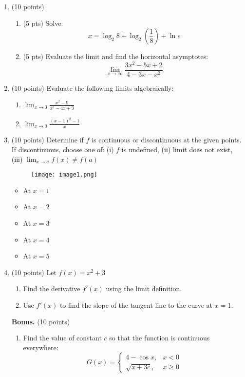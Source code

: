 \documentclass[12pt]{article}
\begin{document}
\begin{enumerate}
    \item (10 points)
    \begin{enumerate}
        \item (5 pts) Solve:
        \[
        x = \log_2 8 + \log_2 \left(\frac{1}{8}\right) + \ln e
        \]

        \item (5 pts) Evaluate the limit and find the horizontal asymptotes:
        \[
        \lim_{x \to \infty} \frac{3x^2 - 5x + 2}{4 - 3x - x^2}
        \]
    \end{enumerate}

    \item (10 points) Evaluate the following limits algebraically:
    \begin{enumerate}
        \item \( \lim_{x \to 3} \frac{x^2 - 9}{x^2 - 4x + 3} \)
        \item \( \lim_{x \to 0} \frac{(x - 1)^2 - 1}{x} \)
    \end{enumerate}

    \item (10 points) Determine if \( f \) is continuous or discontinuous at the given points. If discontinuous, choose one of: 
    (i) \( f \) is undefined, 
    (ii) limit does not exist, 
    (iii) \( \lim_{x \to a} f(x) \neq f(a) \)
    \begin{figure}[ht!]
        \centering
        \texttt{[image: image1.png]}
    \end{figure}
    \begin{itemize}
        \item At \( x = 1 \)
        \item At \( x = 2 \)
        \item At \( x = 3 \)
        \item At \( x = 4 \)
        \item At \( x = 5 \)
    \end{itemize}

    \item (10 points) Let \( f(x) = x^2 + 3 \)
    \begin{enumerate}
        \item Find the derivative \( f'(x) \) using the limit definition.
        \item Use \( f'(x) \) to find the slope of the tangent line to the curve at \( x = 1 \).
    \end{enumerate}

    \item[\textbf{Bonus.}] (10 points)
    \begin{enumerate}
        \item Find the value of constant \( c \) so that the function is continuous everywhere:
        \[
        G(x) = 
        \begin{cases}
            4 - \cos x, & x < 0 \\
            \sqrt{x + 3c}, & x \geq 0
        \end{cases}
        \]


\end{enumerate}
\end{enumerate}
\end{document}
